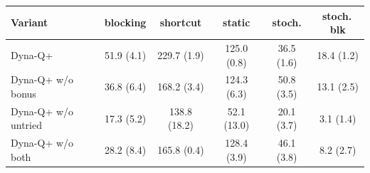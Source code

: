 \begin{tabular}{lccccc}
\toprule
Variant & blocking & shortcut & static & stoch. & stoch.\,blk \\
\midrule
Dyna-Q+ & 51.9 (4.1) & 229.7 (1.9) & 125.0 (0.8) & 36.5 (1.6) & 18.4 (1.2) \\
Dyna-Q+ w/o bonus & 36.8 (6.4) & 168.2 (3.4) & 124.3 (6.3) & 50.8 (3.5) & 13.1 (2.5) \\
Dyna-Q+ w/o untried & 17.3 (5.2) & 138.8 (18.2) & 52.1 (13.0) & 20.1 (3.7) & 3.1 (1.4) \\
Dyna-Q+ w/o both & 28.2 (8.4) & 165.8 (0.4) & 128.4 (3.9) & 46.1 (3.8) & 8.2 (2.7) \\
\bottomrule
\end{tabular}
